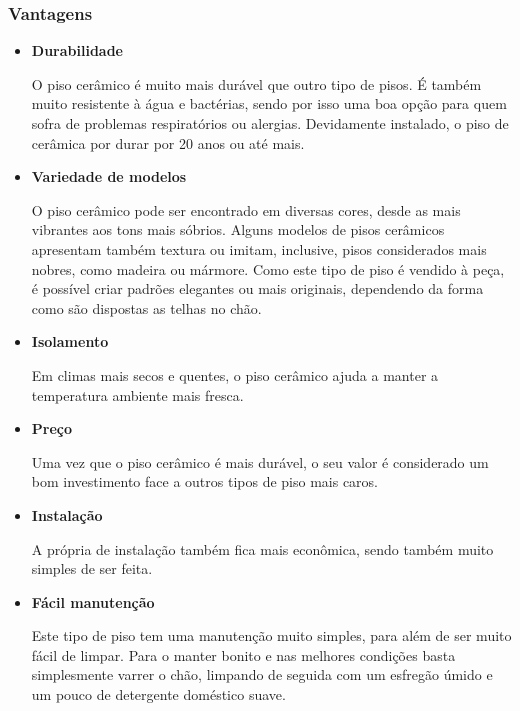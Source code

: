 \subsubsection*{\textbf{Vantagens}}

	\begin{itemize}

		\item \textbf{Durabilidade}
		
		O piso cerâmico é muito mais durável que outro tipo de pisos. É também muito resistente à água e bactérias, sendo por isso uma boa opção para quem sofra de problemas respiratórios ou alergias. Devidamente instalado, o piso de cerâmica por durar por 20 anos ou até mais.

\newpage

		\item \textbf{Variedade de modelos}
		
		O piso cerâmico pode ser encontrado em diversas cores, desde as mais vibrantes aos tons mais sóbrios. Alguns modelos de pisos cerâmicos apresentam também textura ou imitam, inclusive, pisos considerados mais nobres, como madeira ou mármore. Como este tipo de piso é vendido à peça, é possível criar padrões elegantes ou mais originais, dependendo da forma como são dispostas as telhas no chão.

		\item \textbf{Isolamento}
		
		Em climas mais secos e quentes, o piso cerâmico ajuda a manter a temperatura ambiente mais fresca.

		\item \textbf{Preço}
		
		Uma vez que o piso cerâmico é mais durável, o seu valor é considerado um bom investimento face a outros tipos de piso mais caros.

		\item \textbf{Instalação}
		
		A própria de instalação também fica mais econômica, sendo também muito simples de ser feita.

		\item \textbf{Fácil manutenção}
		
		Este tipo de piso tem uma manutenção muito simples, para além de ser muito fácil de limpar. Para o manter bonito e nas melhores condições basta simplesmente varrer o chão, limpando de seguida com um esfregão úmido e um pouco de detergente doméstico suave.

	\end{itemize}

